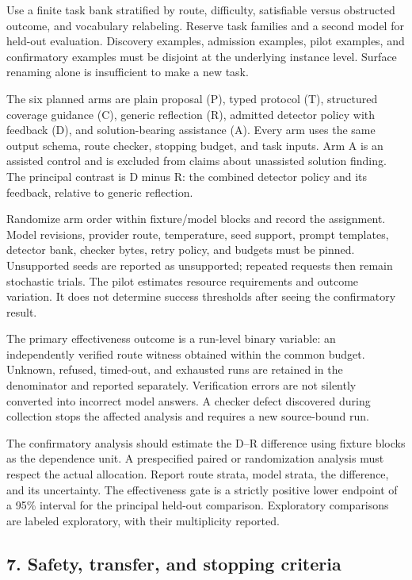 \documentclass[
  11pt,
]{article}
\begin{document}
Use a finite task bank stratified by route, difficulty, satisfiable
versus obstructed outcome, and vocabulary relabeling. Reserve task
families and a second model for held-out evaluation. Discovery examples,
admission examples, pilot examples, and confirmatory examples must be
disjoint at the underlying instance level. Surface renaming alone is
insufficient to make a new task.

The six planned arms are plain proposal (P), typed protocol (T),
structured coverage guidance (C), generic reflection (R), admitted
detector policy with feedback (D), and solution-bearing assistance (A).
Every arm uses the same output schema, route checker, stopping budget,
and task inputs. Arm A is an assisted control and is excluded from
claims about unassisted solution finding. The principal contrast is D
minus R: the combined detector policy and its feedback, relative to
generic reflection.

Randomize arm order within fixture/model blocks and record the
assignment. Model revisions, provider route, temperature, seed support,
prompt templates, detector bank, checker bytes, retry policy, and
budgets must be pinned. Unsupported seeds are reported as unsupported;
repeated requests then remain stochastic trials. The pilot estimates
resource requirements and outcome variation. It does not determine
success thresholds after seeing the confirmatory result.

The primary effectiveness outcome is a run-level binary variable: an
independently verified route witness obtained within the common budget.
Unknown, refused, timed-out, and exhausted runs are retained in the
denominator and reported separately. Verification errors are not
silently converted into incorrect model answers. A checker defect
discovered during collection stops the affected analysis and requires a
new source-bound run.

The confirmatory analysis should estimate the D--R difference using
fixture blocks as the dependence unit. A prespecified paired or
randomization analysis must respect the actual allocation. Report route
strata, model strata, the difference, and its uncertainty. The
effectiveness gate is a strictly positive lower endpoint of a 95\%
interval for the principal held-out comparison. Exploratory comparisons
are labeled exploratory, with their multiplicity reported.

\subsection{7. Safety, transfer, and stopping
criteria}\label{safety-transfer-and-stopping-criteria}
\end{document}

